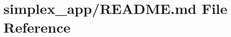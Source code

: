 \hypertarget{simplex__app_2README_8md}{}\section{simplex\+\_\+app/\+R\+E\+A\+D\+ME.md File Reference}
\label{simplex__app_2README_8md}
